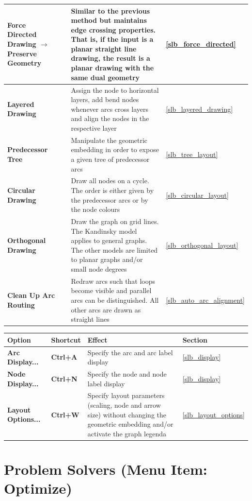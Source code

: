 \documentclass[a4paper,11pt,twoside]{book}
\begin{document}
\begin{tabular}{p{4.7cm}|p{2cm}|p{16.3cm}|p{1.5cm}}
\bf Force Directed Drawing $\rightarrow$ Preserve Geometry &\bf &
    Similar to the previous method but maintains edge crossing properties.
    That is, if the input is a planar straight line drawing, the result is
    a planar drawing with the same dual geometry &
    \ref{slb_force_directed} \\ \hline
\bf Layered Drawing &\bf &
    Assign the node to horizontal layers, add bend nodes whenever arcs cross
    layers and align the nodes in the respective layer &
    \ref{slb_layered_drawing} \\ \hline
\bf Predecessor Tree &\bf &
    Manipulate the geometric embedding in order to expose a given tree of
    predecessor arcs &
    \ref{slb_tree_layout} \\ \hline
\bf Circular Drawing &\bf &
    Draw all nodes on a cycle. The order is either given by the predecessor
    arcs or by the node colours &
    \ref{slb_circular_layout} \\ \hline
\bf Orthogonal Drawing &\bf &
    Draw the graph on grid lines. The Kandinsky model applies to general
    graphs. The other models are limited to planar graphs and/or small node
    degrees &
    \ref{slb_orthogonal_layout} \\ \hline
\bf Clean Up Arc Routing &\bf &
    Redraw arcs such that loops become visible and parallel arcs can be
    distinguished. All other arcs are drawn as straight lines &
    \ref{slb_auto_arc_alignment} \\ \hline
\end{tabular}

\vfill
\bigskip
\noindent
\begin{tabular}{p{4.7cm}|p{2cm}|p{16.3cm}|p{1.5cm}} 
\large\bf Option & \large\bf Shortcut & \large\bf Effect & \large\bf Section \\
[1mm] \hline \hline
\bf Arc Display... &\bf Ctrl+A&
    Specify the arc and arc label display &
    \ref{slb_display} \\ \hline
\bf Node Display... &\bf Ctrl+N &
    Specify the node and node label display &
    \ref{slb_display} \\ \hline
\bf Layout Options... &\bf Ctrl+W &
    Specify layout parameters (scaling, node and arrow size) without
    changing the geometric embedding and/or activate the graph legenda &
    \ref{slb_layout_options}
\end{tabular}


\vfill
\bigskip
\section{Problem Solvers (Menu Item: Optimize)}
\end{document}
